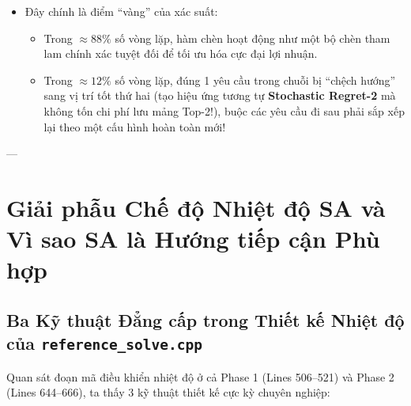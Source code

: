 \documentclass[11pt,a4paper]{article}
\theoremstyle{definition}
\begin{document}
\begin{enumerate}[leftmargin=1.5em]
\begin{itemize}[leftmargin=1.2em]
        \item Đây chính là điểm ``vàng'' của xác suất:
        \begin{itemize}
            \item Trong $\approx 88\%$ số vòng lặp, hàm chèn hoạt động như một bộ chèn tham lam chính xác tuyệt đối để tối ưu hóa cực đại lợi nhuận.
            \item Trong $\approx 12\%$ số vòng lặp, đúng 1 yêu cầu trong chuỗi bị ``chệch hướng'' sang vị trí tốt thứ hai (tạo hiệu ứng tương tự \textbf{Stochastic Regret-2} mà không tốn chi phí lưu mảng Top-2!), buộc các yêu cầu đi sau phải sắp xếp lại theo một cấu hình hoàn toàn mới!
        \end{itemize}
    \end{itemize}
\end{enumerate}

---

\section{Giải phẫu Chế độ Nhiệt độ SA và Vì sao SA là Hướng tiếp cận Phù hợp}

\subsection{Ba Kỹ thuật Đẳng cấp trong Thiết kế Nhiệt độ của \texttt{reference\_solve.cpp}}
Quan sát đoạn mã điều khiển nhiệt độ ở cả Phase 1 (Lines 506--521) và Phase 2 (Lines 644--666), ta thấy 3 kỹ thuật thiết kế cực kỳ chuyên nghiệp:
\end{document}
